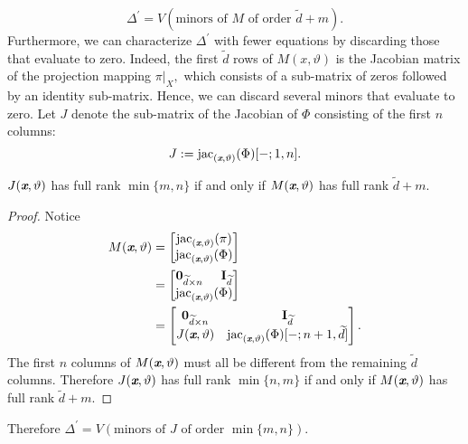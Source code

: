 \documentclass[sigconf]{acmart}
\def\xb{\textit{\textbf{x}}}
\def\vt{\vartheta}
\def\jac{ \textrm{jac}}
\def\dt{\widetilde{d}}
\def\bbm{\begin{bmatrix}}
\def\ebm{\end{bmatrix}}
\begin{document}
\[
\Delta^{'} = V(\textrm{minors of }M\textrm{ of order }\dt + m).
\]
Furthermore, we can characterize $\Delta^{'}$ with fewer equations by discarding those that evaluate to zero. Indeed, the first $\dt$ rows of $M(x,\vt)$ is the Jacobian matrix of the projection mapping $\pi|_X,$ which consists of a sub-matrix of zeros followed by an identity sub-matrix. Hence, we can discard several minors that evaluate to zero. Let $J$ denote the sub-matrix of the Jacobian of $\Phi$ consisting of the first $n$ columns:
 \[J := \jac_{(\xb,\vt)}(\Phi)[-;1,n].\]
\begin{proposition} 
$J(\xb,\vt)$ has full rank $\min\{m,n\}$ if and only if $M(\xb,\vt)$ has full rank $\dt+m.$ 
\end{proposition}
\begin{proof}
Notice 
\begin{align*}
M(\xb,\vt)&= 
\bbm 
\jac_{(\xb,\vt)}(\pi)\\
\jac_{(\xb,\vt)}(\Phi) 
\ebm \\
&=
\bbm 
\textbf{0}_{\dt \times n}\hspace{5mm}\textbf{I}_{\dt} \\
\jac_{(\xb,\vt)}(\Phi)
\ebm\\
&=
\bbm 
\textbf{0}_{\dt \times n} &\textbf{I}_{\dt} \\
J(\xb,\vt)     &\jac_{(\xb,\vt)}(\Phi)[-;n+1,\dt]
\ebm.
\end{align*}
The first $n$ columns of $M(\xb,\vt)$ must all be different from the remaining $\dt$ columns. Therefore $J(\xb,\vt)$ has full rank $\min\{n,m\}$ if and only if $M(\xb,\vt)$ has full rank $\dt+m.$
\end{proof}
Therefore $\Delta^{'} = V(\textrm{minors of }J\textrm{ of order }\min\{m,n\}).$
%
%
%
%
\end{document}
